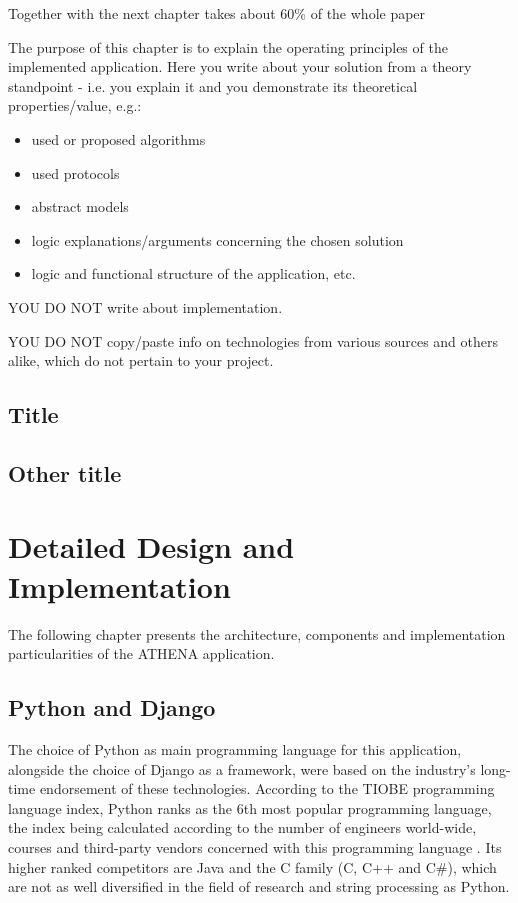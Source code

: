 \documentclass[12pt,a4paper,twoside]{report}
\begin{document}
Together with the next chapter takes about 60\% of the whole paper

The purpose of this chapter is to explain the operating principles of the implemented application.
Here you write about your solution from a theory standpoint - i.e. you explain it and you demonstrate its theoretical properties/value, e.g.:
\begin{itemize}
 \item used or proposed algorithms
 \item used protocols
 \item abstract models
 \item logic explanations/arguments concerning the chosen solution
 \item logic and functional structure of the application, etc.
\end{itemize}

{\color{red} YOU DO NOT write about implementation.

YOU DO NOT copy/paste info on technologies from various sources and others alike, which do not pertain to your project.
}

\section{Title}
\section{Other title}


\chapter{Detailed Design and Implementation}
The following chapter presents the architecture, components and implementation particularities of the ATHENA application.

\section{Python and Django}
The choice of Python as main programming language for this application, alongside the choice of Django as a framework, were based on the industry's long-time endorsement of these technologies. According to the TIOBE programming language index, Python ranks as the 6th most popular programming language, the index being calculated according to the number of engineers world-wide, courses and third-party vendors concerned with this programming language \cite{tiobeindex}. Its higher ranked competitors are Java and the C family (C, C++ and C\#), which are not as well diversified in the field of research and string processing as Python.
\end{document}
